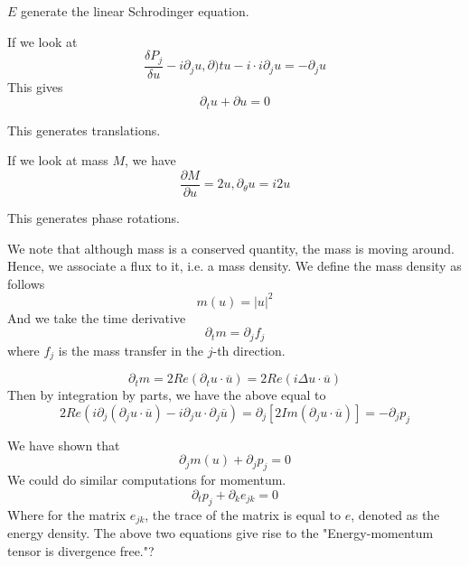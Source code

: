 $E$ generate the linear Schrodinger equation.

If we look at
\begin{equation*}
    \frac{\delta P_j}{\delta u}-i\partial_j u, \partial)t u-i\cdot i\partial_j u=-\partial_j u
\end{equation*}
This gives
\begin{equation*}
    \partial_t u+\partial u=0
\end{equation*}

This generates translations.

If we look at mass $M$, we have
\begin{equation*}
    \frac{\partial M}{\partial u}=2u, \partial_\theta u=i2u
\end{equation*}

This generates phase rotations.

We note that although mass is a conserved quantity, the mass is moving around. Hence, we associate a flux to it, i.e. a mass density. We define the mass density as follows
\begin{equation*}
    m(u)=|u|^2
\end{equation*}
And we take the time derivative
\begin{equation*}
    \partial_t m=\partial_jf_j
\end{equation*}
where $f_j$ is the mass transfer in the $j$-th direction.

\begin{equation*}
    \partial_tm=2Re(\partial_t u\cdot\overline{u})=2 Re(i\Delta u\cdot\overline{u})
\end{equation*}
Then by integration by parts, we have the above equal to
\begin{equation*}
    2Re(i\partial_j(\partial_j u\cdot\overline{u})-i\partial_ju\cdot\partial_j\overline{u})=\partial_j[2Im(\partial_ju\cdot\overline{u})]=-\partial_jp_j
\end{equation*}


We have shown that
\begin{equation*}
    \partial_jm(u)+\partial_jp_j=0
\end{equation*}
We could do similar computations for momentum.
\begin{equation*}
    \partial_tp_j+\partial_ke_{jk}=0
\end{equation*}
Where for the matrix $e_{jk}$, the trace of the matrix is equal to $e$, denoted as the energy density.
The above two equations give rise to the "Energy-momentum tensor is divergence free."?

